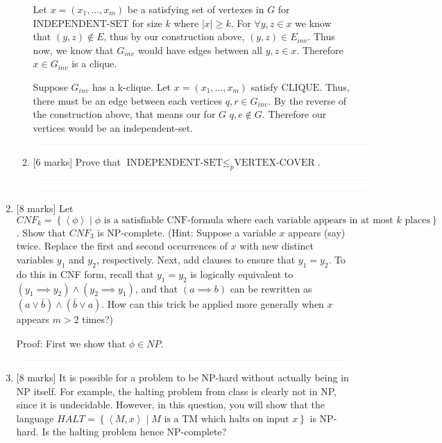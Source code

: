 \documentclass{article}
\newcommand{\class}[1]{\text{#1}}
\newcommand{\set}[1]{{\left\{#1\right\}}}    %
\newcommand{\enc}[1]{\left<#1\right>}
\begin{document}
\begin{enumerate}
\begin{enumerate}
            Let $x = (x_1, . . . , x_m)$ be a satisfying set of vertexes in $G$ for $\class{INDEPENDENT-SET}$ for size $k$ where $|x| \geq k$. For $\forall y,z \in x$ we know that $(y,z) \not\in E$, thus by our construction above, $(y,z) \in E_{inv}$. Thus now, we know that $G_{inv}$ would have edges between all $y,z \in x$. Therefore $x \in G_{inv}$ is a clique.

         Suppose $G_{inv}$ has a k-clique. Let $x = (x_1, . . . , x_m)$ satisfy $\class{CLIQUE}$. Thus, there must be an edge between each vertices $q,r \in G_{inv}$. By the reverse of the construction above, that means our for $G$ $q,e \not\in G$. Therefore our vertices would be an independent-set.

            $\textcolor[RGB]{220,220,220}{\rule{\linewidth}{0.2pt}}$

        \item {[6 marks]} Prove that $\class{INDEPENDENT-SET}\leq_p\class{VERTEX-COVER}$.

            $\textcolor[RGB]{220,220,220}{\rule{\linewidth}{0.2pt}}$


            $\textcolor[RGB]{220,220,220}{\rule{\linewidth}{0.2pt}}$


    \end{enumerate}
    \item {[8 marks]} Let $CNF_k=\set{\enc{\phi}\mid\phi\text{ is a satisfiable CNF-formula where each variable appears in at most }k\text{ places}}$. Show that ${CNF}_3$ is NP-complete. (Hint: Suppose a variable $x$ appears (say) twice. Replace the first and second occurrences of $x$ with new distinct variables $y_1$ and $y_2$, respectively. Next, add clauses to ensure that $y_1=y_2$. To do this in CNF form, recall that $y_1=y_2$ is logically equivalent to $(y_1\implies y_2)\wedge(y_2\implies y_1)$, and that $(a\implies b)$ can be rewritten as $(a\vee \bar{b})\wedge (\bar{b}\vee {a})$. How can this trick be applied more generally when $x$ appears $m>2$ times?)


            $\textcolor[RGB]{220,220,220}{\rule{\linewidth}{0.2pt}}$
            Proof: First we show that $\phi \in NP$.

            $\textcolor[RGB]{220,220,220}{\rule{\linewidth}{0.2pt}}$

    \item {[8 marks]} It is possible for a problem to be NP-hard without actually being in NP itself. For example, the halting problem from class is clearly not in NP, since it is undecidable. However, in this question, you will show that the language $HALT=\set{\enc{M,x}\mid M\text{ is a TM which halts on input }x}$ is NP-hard. Is the halting problem hence NP-complete?



\end{enumerate}
\end{document}
